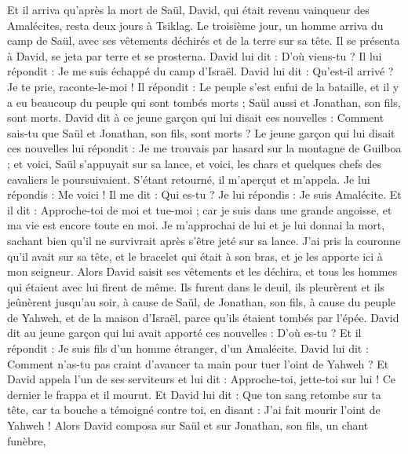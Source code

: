 \begin{multicols}{2}
\VerseOne{}Et il arriva qu'après la mort de Saül, David, qui était revenu vainqueur des Amalécites, resta deux jours à Tsiklag.
Le troisième jour, un homme arriva du camp de Saül, avec ses vêtements déchirés et de la terre sur sa tête. Il se présenta à David, se jeta par terre et se prosterna.
David lui dit : D'où viens-tu ? Il lui répondit : Je me suis échappé du camp d'Israël.
David lui dit : Qu'est-il arrivé ? Je te prie, raconte-le-moi ! Il répondit : Le peuple s'est enfui de la bataille, et il y a eu beaucoup du peuple qui sont tombés morts ; Saül aussi et Jonathan, son fils, sont morts.
David dit à ce jeune garçon qui lui disait ces nouvelles : Comment sais-tu que Saül et Jonathan, son fils, sont morts ?
Le jeune garçon qui lui disait ces nouvelles lui répondit : Je me trouvais par hasard sur la montagne de Guilboa ; et voici, Saül s'appuyait sur sa lance, et voici, les chars et quelques chefs des cavaliers le poursuivaient.
S'étant retourné, il m'aperçut et m'appela. Je lui répondis : Me voici !
Il me dit : Qui es-tu ? Je lui répondis : Je suis Amalécite.
Et il dit : Approche-toi de moi et tue-moi ; car je suis dans une grande angoisse, et ma vie est encore toute en moi.
Je m'approchai de lui et je lui donnai la mort, sachant bien qu'il ne survivrait après s'être jeté sur sa lance. J'ai pris la couronne qu'il avait sur sa tête, et le bracelet qui était à son bras, et je les apporte ici à mon seigneur.
Alors David saisit ses vêtements et les déchira, et tous les hommes qui étaient avec lui firent de même.
Ils furent dans le deuil, ils pleurèrent et ils jeûnèrent jusqu'au soir, à cause de Saül, de Jonathan, son fils, à cause du peuple de Yahweh, et de la maison d'Israël, parce qu'ils étaient tombés par l'épée.
David dit au jeune garçon qui lui avait apporté ces nouvelles : D'où es-tu ? Et il répondit : Je suis fils d'un homme étranger, d'un Amalécite.
David lui dit : Comment n'as-tu pas craint d'avancer ta main pour tuer l'oint de Yahweh ?
Et David appela l'un de ses serviteurs et lui dit : Approche-toi, jette-toi sur lui ! Ce dernier le frappa et il mourut.
Et David lui dit : Que ton sang retombe sur ta tête, car ta bouche a témoigné contre toi, en disant : J'ai fait mourir l'oint de Yahweh !
Alors David composa sur Saül et sur Jonathan, son fils, un chant funèbre,

\end{multicols}
